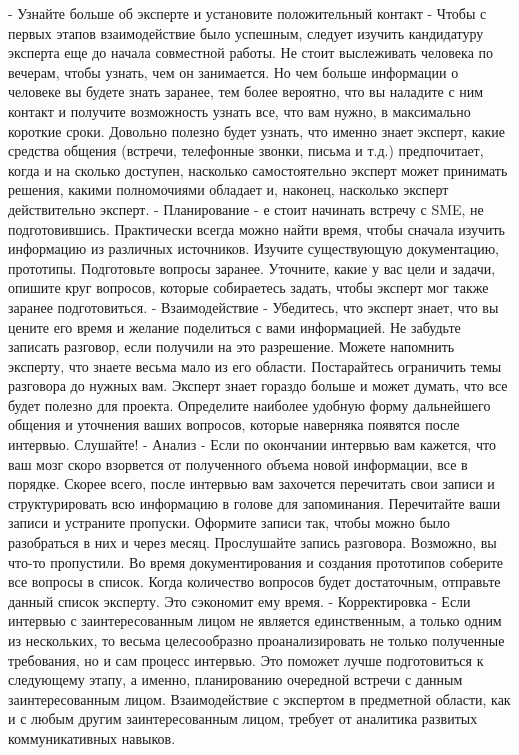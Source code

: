 \documentclass{../industrial-development}
\begin{document}
\lecturenotes
- Узнайте больше об эксперте и установите положительный контакт - Чтобы с первых этапов взаимодействие было успешным, следует изучить кандидатуру эксперта еще до начала совместной работы. Не стоит выслеживать человека по вечерам, чтобы узнать, чем он занимается. Но чем больше информации о человеке вы будете знать заранее, тем более вероятно, что вы наладите с ним контакт и получите возможность узнать все, что вам нужно, в максимально короткие сроки. Довольно полезно будет узнать, что именно знает эксперт, какие средства общения (встречи, телефонные звонки, письма и т.д.) предпочитает, когда и на сколько доступен, насколько самостоятельно эксперт может принимать решения, какими полномочиями обладает и, наконец, насколько эксперт действительно эксперт.
- Планирование - е стоит начинать встречу с SME, не подготовившись. Практически всегда можно найти время, чтобы сначала изучить информацию из различных источников. Изучите существующую документацию, прототипы. Подготовьте вопросы заранее. Уточните, какие у вас цели и задачи, опишите круг вопросов, которые собираетесь задать, чтобы эксперт мог также заранее подготовиться.
- Взаимодействие - Убедитесь, что эксперт знает, что вы цените его время и желание поделиться с вами информацией. Не забудьте записать разговор, если получили на это разрешение. Можете напомнить эксперту, что знаете весьма мало из его области. Постарайтесь ограничить темы разговора до нужных вам. Эксперт знает гораздо больше и может думать, что все будет полезно для проекта. Определите наиболее удобную форму дальнейшего общения и уточнения ваших вопросов, которые наверняка появятся после интервью. Слушайте!
- Анализ - Если по окончании интервью вам кажется, что ваш мозг скоро взорвется от полученного объема новой информации, все в порядке. Скорее всего, после интервью вам захочется перечитать свои записи и структурировать всю информацию в голове для запоминания. Перечитайте ваши записи и устраните пропуски. Оформите записи так, чтобы можно было разобраться в них и через месяц. Прослушайте запись разговора. Возможно, вы что-то пропустили. Во время документирования и создания прототипов соберите все вопросы в список. Когда количество вопросов будет достаточным, отправьте данный список эксперту. Это сэкономит ему время.
- Корректировка - Если интервью с заинтересованным лицом не является единственным, а только одним из нескольких, то весьма целесообразно проанализировать не только полученные требования, но и сам процесс интервью. Это поможет лучше подготовиться к следующему этапу, а именно, планированию очередной встречи с данным заинтересованным лицом. Взаимодействие с экспертом в предметной области, как и с любым другим заинтересованным лицом, требует от аналитика развитых коммуникативных навыков.

\begin{thebibliography}{99}
\end{thebibliography} 
\end{document}

